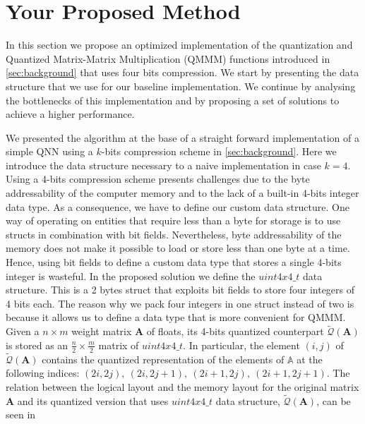 \section{Your Proposed Method}\label{sec:yourmethod}
In this section we propose an optimized implementation of the quantization and Quantized Matrix-Matrix Multiplication (QMMM) functions introduced in \cref{sec:background} that uses four bits compression. We start by presenting the data structure that we use for our baseline implementation. We continue by analysing the bottlenecks of this implementation and by proposing a set of solutions to achieve a higher performance.

We presented the algorithm at the base of a straight forward implementation of a simple QNN using a $k$-bits compression scheme in \cref{sec:background}. Here we introduce the data structure necessary to a naive implementation in case $k=4$. Using a 4-bits compression scheme presents challenges due to the byte addressability of the computer memory and to the lack of a built-in 4-bits integer data type. As a consequence, we have to define our custom data structure. One way of operating on entities that require less than a byte for storage is to use structs in combination with bit fields. Nevertheless, byte addressability of the memory does not make it possible to load or store less than one byte at a time. Hence, using bit fields to define a custom data type that stores a single 4-bits integer is wasteful.  In the proposed solution we define the $uint4x4\_t$ data structure. This is a 2 bytes struct that exploits bit fields to store four integers of 4 bits each. The reason why we pack four integers in one struct instead of two is because it allows us to define a data type that is more convenient for QMMM. Given a $n\times m$ weight matrix $\mathbf{A}$ of floats, its 4-bits quantized counterpart $\tilde{\mathcal{Q}}(\mathbf{A})$ is stored as an $\frac{n}{2}\times \frac{m}{2}$ matrix of $uint4x4\_t$. In particular, the element $(i, j)$ of $\tilde{\mathcal{Q}}(\mathbf{A})$ contains the quantized representation of the elements of $\mathbb{A}$ at the following indices: $(2i, 2j),~(2i, 2j+1),~(2i+1, 2j),~(2i+1, 2j+1)$. The relation between the logical layout and the memory layout for the original matrix $\mathbf{A}$ and its quantized version that uses $uint4x4\_t$ data structure,   $\tilde{\mathcal{Q}}(\mathbf{A})$, can be seen in 

